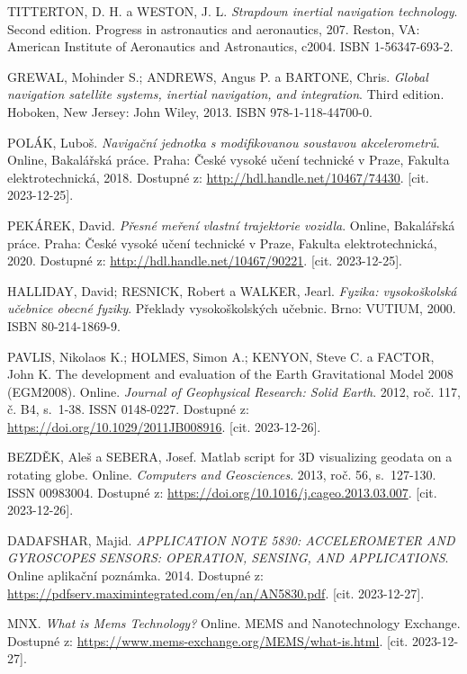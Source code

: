 \begin{thebibliography}{99}

TITTERTON, D. H. a WESTON, J. L. \textit{Strapdown inertial navigation technology}. Second edition. Progress in astronautics and aeronautics, 207. Reston, VA: American Institute of Aeronautics and Astronautics, c2004. ISBN 1-56347-693-2.

GREWAL, Mohinder S.; ANDREWS, Angus P. a BARTONE, Chris. \textit{Global navigation satellite systems, inertial navigation, and integration}. Third edition. Hoboken, New Jersey: John Wiley, 2013. ISBN 978-1-118-44700-0.

POLÁK, Luboš. \textit{Navigační jednotka s modifikovanou soustavou akcelerometrů}. Online, Bakalářská práce. Praha: České vysoké učení technické v Praze, Fakulta elektrotechnická, 2018. Dostupné z: \url{http://hdl.handle.net/10467/74430}. [cit. 2023-12-25].

PEKÁREK, David. \textit{Přesné meření vlastní trajektorie vozidla}. Online, Bakalářská práce. Praha: České vysoké učení technické v Praze, Fakulta elektrotechnická, 2020. Dostupné z: \url{http://hdl.handle.net/10467/90221}. [cit. 2023-12-25].

HALLIDAY, David; RESNICK, Robert a WALKER, Jearl. \textit{Fyzika: vysokoškolská učebnice obecné fyziky}. Překlady vysokoškolských učebnic. Brno: VUTIUM, 2000. ISBN 80-214-1869-9.

PAVLIS, Nikolaos K.; HOLMES, Simon A.; KENYON, Steve C. a FACTOR, John K. The development and evaluation of the Earth Gravitational Model 2008 (EGM2008). Online. \textit{Journal of Geophysical Research: Solid Earth}. 2012, roč. 117, č. B4, s.~1-38. ISSN 0148-0227. Dostupné z: \url{https://doi.org/10.1029/2011JB008916}. [cit. 2023-12-26].

BEZDĚK, Aleš a SEBERA, Josef. Matlab script for 3D visualizing geodata on a rotating globe. Online. \textit{Computers and Geosciences}. 2013, roč. 56, s.~127-130. ISSN 00983004. Dostupné z: \url{https://doi.org/10.1016/j.cageo.2013.03.007}. [cit. 2023-12-26].

DADAFSHAR, Majid. \textit{APPLICATION NOTE 5830: ACCELEROMETER AND GYROSCOPES SENSORS: OPERATION, SENSING, AND APPLICATIONS}. Online aplikační poznámka. 2014. Dostupné z: \url{https://pdfserv.maximintegrated.com/en/an/AN5830.pdf}. [cit. 2023-12-27].

MNX. \textit{What is Mems Technology?} Online. MEMS and Nanotechnology Exchange. Dostupné z: \url{https://www.mems-exchange.org/MEMS/what-is.html}. [cit. 2023-12-27].


\end{thebibliography}
